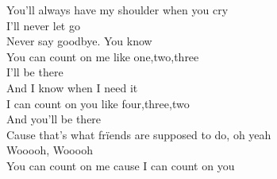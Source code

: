 You'll always have my shoulder when you cry\\
I'll never let go \\
Never say goodbye. You know\\
\newpage
You can count on me like one,two,three\\
I'll be there\\
And I know when I need it \\
I can count on you like four,three,two\\
And you'll be there\\
Cause that's what frïends are supposed to do, oh yeah\\
Wooooh, Wooooh\\
You can count on me cause I can count on you\\
